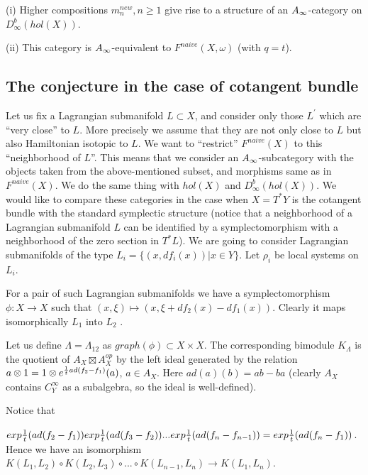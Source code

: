 \documentclass[a4paper,12pt]{article}
\begin{document}
\begin{conj} (i)  Higher compositions $m_n^{new}, n\ge 1$ give rise
to a structure of an  $A_{\infty}$-category on $D^b_{\infty}(hol(X))$.

(ii) This category is $A_{\infty}$-equivalent to $F^{naive}(X,\omega)$ (with $q=t$).

\end{conj}

\subsection {The conjecture in the case of cotangent bundle}

Let us fix a Lagrangian submanifold $L\subset X$, and consider
only those $L^{\prime}$ which are ``very close'' to $L$.
More precisely we assume that they are not only close
to $L$ but also Hamiltonian isotopic to $L$.
We want to  ``restrict'' $F^{naive}(X)$ to this ``neighborhood of $L$''.
This means that we consider an $A_{\infty}$-subcategory with the
objects taken from the above-mentioned subset, and morphisms
same as in $F^{naive}(X)$. We do the same thing with $hol(X)$ and 
$D^b_{\infty}(hol(X))$. We would like to compare these categories
in the case when $X=T^{\ast}Y$ is the cotangent bundle
with the standard symplectic structure (notice that a neighborhood of a
Lagrangian submanifold $L$ can be identified by a symplectomorphism
with a neighborhood of the zero section in $T^{\ast}L$).
We are going to consider Lagrangian
submanifolds of the type $L_i=\{(x, df_i(x))|x\in Y\}$.
Let $\rho_i$ be local systems on $L_i$.

For a pair of such Lagrangian submanifolds we have a symplectomorphism
$\phi:X\to X$ such that $(x,\xi)\mapsto (x, \xi+df_2(x)-df_1(x))$. 
Clearly it maps isomorphically
$L_1$ into $L_2$ .

Let us define $\Lambda=\Lambda_{12}$ as $graph(\phi)\subset X\times X$.
The corresponding bimodule $K_{\Lambda}$ is 
the quotient of $A_X\boxtimes A_X^{op}$ by the 
left ideal generated
by the relation $a\otimes 1=1\otimes e^{{1\over t}ad(f_2-f_1)}(a)$, $a\in A_X$.
Here $ad(a)(b)=ab-ba$ (clearly $A_X$ contains $C_Y^{\infty}$ as a subalgebra,
so the ideal is well-defined).

Notice that 

$exp{1\over t}(ad(f_2-f_1))exp{1\over t}(ad(f_3-f_2))...
exp{1\over t}(ad(f_n-f_{n-1}))=exp{1\over t}(ad(f_n-f_1))$. 
Hence we have an
isomorphism $K(L_1,L_2)\circ K(L_2,L_3)\circ...\circ K(L_{n-1},L_n)
\to K(L_1,L_n)$.
\end{document}
